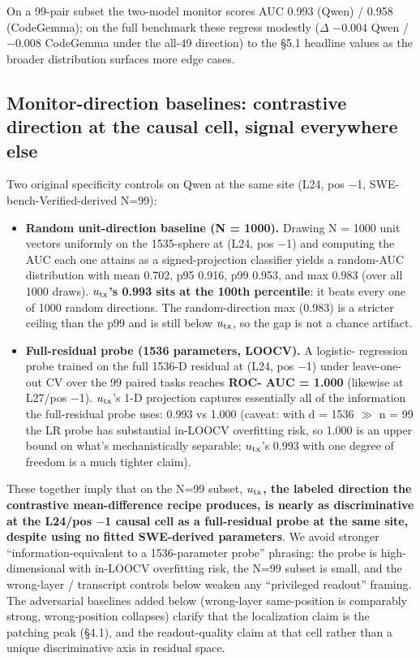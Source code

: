 \documentclass[
  11pt,
  a4paper]{article}
\providecommand{\tightlist}{%
  \setlength{\itemsep}{0pt}\setlength{\parskip}{0pt}}
\begin{document}
On a 99-pair subset the two-model monitor scores AUC 0.993 (Qwen) /
0.958 (CodeGemma); on the full benchmark these regress modestly (\ensuremath{\Delta}
\ensuremath{-}0.004 Qwen / \ensuremath{-}0.008 CodeGemma under the all-49 direction) to the \S{}5.1
headline values as the broader distribution surfaces more edge cases.

\subsection{Monitor-direction baselines: contrastive direction at the
causal cell, signal everywhere
else}\label{monitor-direction-baselines-contrastive-direction-at-the-causal-cell-signal-everywhere-else}

Two original specificity controls on Qwen at the same site (L24, pos \ensuremath{-}1,
SWE-bench-Verified-derived N=99):

\begin{itemize}
\tightlist
\item
  \textbf{Random unit-direction baseline (N = 1000).} Drawing N = 1000
  unit vectors uniformly on the 1535-sphere at (L24, pos \ensuremath{-}1) and
  computing the \textbar AUC\textbar{} each one attains as a
  signed-projection classifier yields a random-AUC distribution with
  mean 0.702, p95 0.916, p99 0.953, and max 0.983 (over all 1000 draws).
  \textbf{\(u_{\rm tx}\)'s 0.993 sits at the 100th percentile}: it beats
  every one of 1000 random directions. The random-direction max (0.983)
  is a stricter ceiling than the p99 and is still below \(u_{\rm tx}\),
  so the gap is not a chance artifact.
\item
  \textbf{Full-residual probe (1536 parameters, LOOCV).} A logistic-
  regression probe trained on the full 1536-D residual at (L24, pos \ensuremath{-}1)
  under leave-one-out CV over the 99 paired tasks reaches \textbf{ROC-
  AUC = 1.000} (likewise at L27/pos \ensuremath{-}1). \(u_{\rm tx}\)'s 1-D projection
  captures essentially all of the information the full-residual probe
  uses: 0.993 vs 1.000 (caveat: with d = 1536 \ensuremath{\gg} n = 99 the LR probe has
  substantial in-LOOCV overfitting risk, so 1.000 is an upper bound on
  what's mechanistically separable; \(u_{\rm tx}\)'s 0.993 with one
  degree of freedom is a much tighter claim).
\end{itemize}

These together imply that on the N=99 subset, \textbf{\(u_{\rm tx}\),
the labeled direction the contrastive mean-difference recipe produces,
is nearly as discriminative at the L24/pos \ensuremath{-}1 causal cell as a
full-residual probe at the same site, despite using no fitted
SWE-derived parameters}. We avoid stronger ``information-equivalent to a
1536-parameter probe'' phrasing: the probe is high-dimensional with
in-LOOCV overfitting risk, the N=99 subset is small, and the wrong-layer
/ transcript controls below weaken any ``privileged readout'' framing.
The adversarial baselines added below (wrong-layer same-position is
comparably strong, wrong-position collapses) clarify that the
localization claim is the patching peak (\S{}4.1), and the readout-quality
claim at that cell rather than a unique discriminative axis in residual
space.
\end{document}
